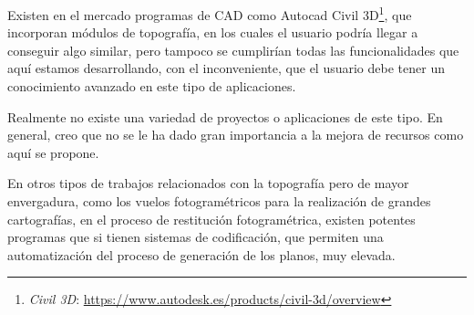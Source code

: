 Existen en el mercado programas de CAD como Autocad Civil 3D\footnote{\textsl{Civil 3D}: \url{https://www.autodesk.es/products/civil-3d/overview}}, que incorporan módulos de topografía, en los cuales el usuario podría llegar a conseguir algo similar, pero tampoco se cumplirían todas las funcionalidades que aquí estamos desarrollando, con el inconveniente, que el usuario debe tener un conocimiento avanzado en este tipo de aplicaciones.

Realmente no existe una variedad de proyectos o aplicaciones de este tipo. En general, creo que no se le ha dado gran importancia a la mejora de recursos como aquí se propone.

En otros tipos de trabajos relacionados con la topografía pero de 
mayor envergadura, como los vuelos fotogramétricos para la realización de grandes cartografías, en el proceso de restitución fotogramétrica, existen potentes programas que si tienen sistemas de codificación, que permiten una automatización del proceso de generación de los planos, muy elevada.